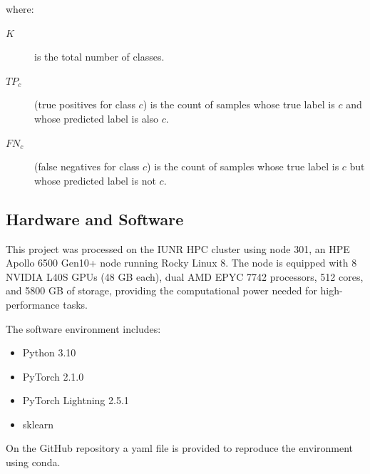     \noindent where:
    \begin{description}
    \item[$K$] is the total number of classes.
    \item[$TP_{c}$] (true positives for class $c$) is the count of samples whose true label is $c$ and whose predicted label is also $c$.
    \item[$FN_{c}$] (false negatives for class $c$) is the count of samples whose true label is $c$ but whose predicted label is not $c$.
    \end{description}


    \subsection{Hardware and Software}

    This project was processed on the IUNR HPC cluster using node 301, an HPE Apollo 6500 Gen10+ node running Rocky Linux 8. 
    The node is equipped with 8 NVIDIA L40S GPUs (48 GB each), dual AMD EPYC 7742 processors, 512 cores, and 5800 GB of storage, providing the computational power needed for high-performance tasks.

    The software environment includes:
    
    \begin{itemize} 
        \item Python 3.10
        \item PyTorch 2.1.0
        \item PyTorch Lightning 2.5.1 \autocite{falconPyTorchLightning2025}
        \item sklearn
    \end{itemize} 

    On the GitHub repository a yaml file is provided to reproduce the environment using conda.

